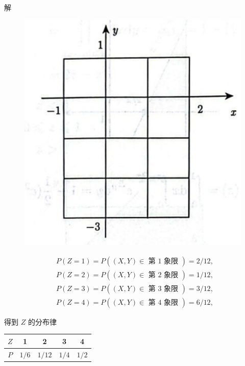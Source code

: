 \documentclass{beamer}
\begin{document}
	\begin{frame}
		解
			\begin{figure}
				\centering
				\includegraphics[scale = 0.15]{figures/figure3.17.png}
			\end{figure}
		$$
		\begin{aligned}
			& P(Z=1)=P((X, Y) \in \text { 第 } 1 \text { 象限 })=2 / 12 \text {, } \\
			& P(Z=2)=P((X, Y) \in \text { 第 } 2 \text { 象限 })=1 / 12 \text {, } \\
			& P(Z=3)=P((X, Y) \in \text { 第 } 3 \text { 象限 })=3 / 12 \text {, } \\
			& P(Z=4)=P((X, Y) \in \text { 第 } 4 \text { 象限 })=6 / 12 \text {, }
		\end{aligned}
		$$
		
		得到 $Z$ 的分布律
		\begin{center}
		\begin{tabular}{c|cccc}
			$Z$ & 1 & 2 & 3 & 4 \\
			\hline
			$P$ & $1 / 6$ & $1 / 12$ & $1 / 4$ & $1 / 2$ \\
		\end{tabular}
		\end{center}
		
	\end{frame}
	
\end{document}
